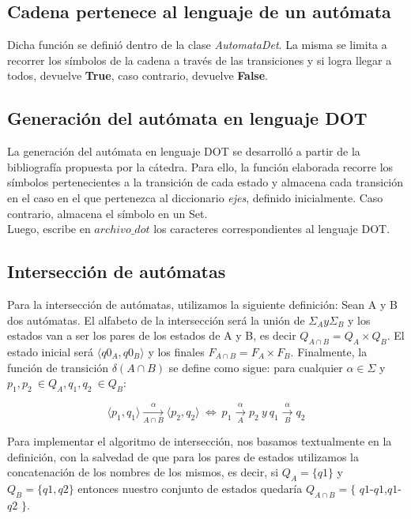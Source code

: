 \documentclass[a4paper, 10pt, twoside]{article}
\begin{document}
\subsection{Cadena pertenece al lenguaje de un autómata}
Dicha función se definió dentro de la clase \textit{AutomataDet}. La misma se limita a recorrer los símbolos de la cadena a través de las transiciones y si logra llegar a todos, devuelve \textbf{True}, caso contrario, devuelve \textbf{False}.

\subsection{Generación del autómata en lenguaje DOT}
La generación del autómata en lenguaje DOT se desarrolló a partir de la bibliografía propuesta por la cátedra. Para ello, la función elaborada recorre los símbolos pertenecientes a la transición de cada estado y almacena cada transición en el caso en el que pertenezca al diccionario \textit{ejes}, definido inicialmente. Caso contrario, almacena el símbolo en un Set.\\
\newline
Luego, escribe en $archivo\_dot$ los caracteres correspondientes al lenguaje DOT.

\subsection{Intersección de autómatas}

Para la intersección de autómatas, utilizamos la siguiente definición: Sean A y B dos autómatas. El alfabeto de la intersección será la unión de $\Sigma_A y \Sigma_B$ y los estados van a ser los pares de los estados de A y B, es decir $Q_{A \cap B} = Q_A \times Q_B$. El estado inicial será $\langle q0_A,q0_B \rangle$ y los finales $F_{A \cap B} = F_A \times F_B$. Finalmente, la función de transición $\delta(A\cap B)$ se define como sigue: para cualquier $\alpha \in \Sigma$ y $p_1, p_2\ \in Q_A, q_1, q_2\ \in Q_B$:

$$\langle p_1,q_1\rangle \xrightarrow[A\cap B]{\alpha}\langle p_2,q_2\rangle \ \Leftrightarrow \ p_1\xrightarrow[A]{\alpha}p_2\ y\ q_1\xrightarrow[B]{\alpha}q_2$$


Para implementar el algoritmo de intersección, nos basamos textualmente en la definición, con la salvedad de que para los pares de estados utilizamos la concatenación de los nombres de los mismos, es decir, si $ Q_A = \lbrace q1 \rbrace$ y $Q_B = \lbrace q1, q2 \rbrace $ entonces nuestro conjunto de estados quedaría $Q_{A \cap B} = \lbrace$ $q1$-$q1$,$q1$-$q2$ $\rbrace$.
\end{document}
